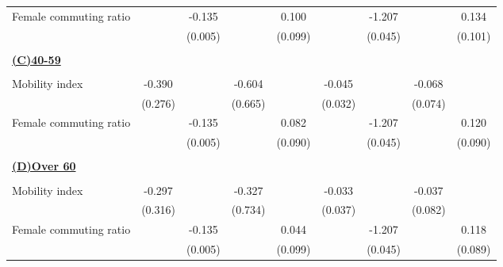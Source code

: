 \begin{tabular}{l*{8}{c}}
\addlinespace
Female commuting ratio&                     &      -0.135\sym{***}&                     &       0.100         &                     &      -1.207\sym{***}&                     &       0.134         \\
                    &                     &     (0.005)         &                     &     (0.099)         &                     &     (0.045)         &                     &     (0.101)         \\
\hline \\ \multicolumn{9}{l}{\textbf{\underline{(C)40-59}}} \\\\[-1ex]
Mobility index      &      -0.390         &                     &      -0.604         &                     &      -0.045         &                     &      -0.068         &                     \\
                    &     (0.276)         &                     &     (0.665)         &                     &     (0.032)         &                     &     (0.074)         &                     \\
\addlinespace
Female commuting ratio&                     &      -0.135\sym{***}&                     &       0.082         &                     &      -1.207\sym{***}&                     &       0.120         \\
                    &                     &     (0.005)         &                     &     (0.090)         &                     &     (0.045)         &                     &     (0.090)         \\
\hline \\ \multicolumn{9}{l}{\textbf{\underline{(D)Over 60}}} \\\\[-1ex]
Mobility index      &      -0.297         &                     &      -0.327         &                     &      -0.033         &                     &      -0.037         &                     \\
                    &     (0.316)         &                     &     (0.734)         &                     &     (0.037)         &                     &     (0.082)         &                     \\
\addlinespace
Female commuting ratio&                     &      -0.135\sym{***}&                     &       0.044         &                     &      -1.207\sym{***}&                     &       0.118         \\
                    &                     &     (0.005)         &                     &     (0.099)         &                     &     (0.045)         &                     &     (0.089)         \\

\end{tabular}
